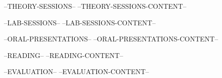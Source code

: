 \begin{evaluation}
--THEORY-SESSIONS--
--THEORY-SESSIONS-CONTENT--

--LAB-SESSIONS--
--LAB-SESSIONS-CONTENT--

--ORAL-PRESENTATIONS--
--ORAL-PRESENTATIONS-CONTENT--

--READING--
--READING-CONTENT--

--EVALUATION--
--EVALUATION-CONTENT--
\end{evaluation}
